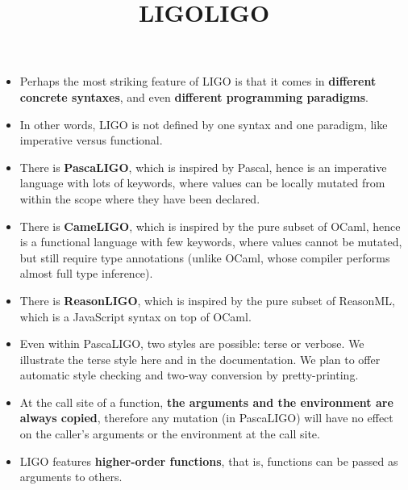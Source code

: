 \documentclass[wide]{slides}
\begin{document}
\begin{slide}
  \title{LIGO}

  \begin{itemize}

    \item Perhaps the most striking feature of LIGO is that it comes
      in \textbf{different concrete syntaxes}, and even
      \textbf{different programming paradigms}.

    \item In other words, LIGO is not defined by one syntax and one
      paradigm, like imperative versus functional.

    \item There is \textbf{PascaLIGO}, which is inspired by Pascal,
      hence is an imperative language with lots of keywords, where
      values can be locally mutated from within the scope where they
      have been declared.

    \item There is \textbf{CameLIGO}, which is inspired by the pure
      subset of OCaml, hence is a functional language with few
      keywords, where values cannot be mutated, but still require type
      annotations (unlike OCaml, whose compiler performs almost full
      type inference).

    \item There is \textbf{ReasonLIGO}, which is inspired by the pure
      subset of ReasonML, which is a JavaScript syntax on top of
      OCaml.

  \end{itemize}

\end{slide}

\begin{slide}
  \title{LIGO}

  \begin{itemize}

    \item Even within PascaLIGO, two styles are possible: terse or
      verbose. We illustrate the terse style here and in the
      documentation. We plan to offer automatic style checking and
      two-way conversion by pretty\hyp{}printing.

    \item At the call site of a function, \textbf{the arguments and
      the environment are always copied}, therefore any mutation (in
      PascaLIGO) will have no effect on the caller's arguments or the
      environment at the call site.

    \item LIGO features \textbf{higher-order functions}, that is,
      functions can be passed as arguments to others.

  \end{itemize}

\end{slide}
\end{document}
